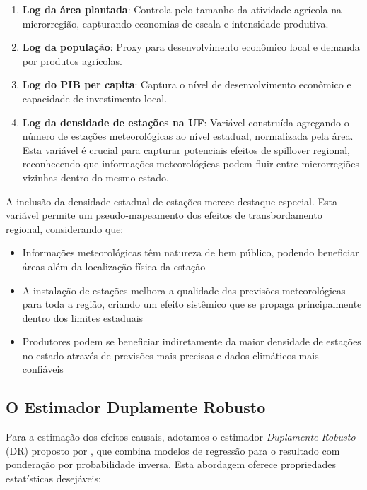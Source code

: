 \documentclass[
	12pt,				%
	oneside,			%
	a4paper,			%
	english,			%
	french,				%
	spanish,			%
	brazil				%
	]{abntex2}
\begin{document}
\begin{enumerate}
\item \textbf{Log da área plantada}: Controla pelo tamanho da atividade agrícola na microrregião, capturando economias de escala e intensidade produtiva.

\item \textbf{Log da população}: Proxy para desenvolvimento econômico local e demanda por produtos agrícolas.

\item \textbf{Log do PIB per capita}: Captura o nível de desenvolvimento econômico e capacidade de investimento local.

\item \textbf{Log da densidade de estações na UF}: Variável construída agregando o número de estações meteorológicas ao nível estadual, normalizada pela área. Esta variável é crucial para capturar potenciais efeitos de spillover regional, reconhecendo que informações meteorológicas podem fluir entre microrregiões vizinhas dentro do mesmo estado.
\end{enumerate}

A inclusão da densidade estadual de estações merece destaque especial. Esta variável permite um pseudo-mapeamento dos efeitos de transbordamento regional, considerando que:

\begin{itemize}
\item Informações meteorológicas têm natureza de bem público, podendo beneficiar áreas além da localização física da estação
\item A instalação de estações melhora a qualidade das previsões meteorológicas para toda a região, criando um efeito sistêmico que se propaga principalmente dentro dos limites estaduais
\item Produtores podem se beneficiar indiretamente da maior densidade de estações no estado através de previsões mais precisas e dados climáticos mais confiáveis
\end{itemize}

\subsection{O Estimador Duplamente Robusto}

Para a estimação dos efeitos causais, adotamos o estimador \textit{Duplamente Robusto} (DR) proposto por , que combina modelos de regressão para o resultado com ponderação por probabilidade inversa. Esta abordagem oferece propriedades estatísticas desejáveis:
\end{document}
